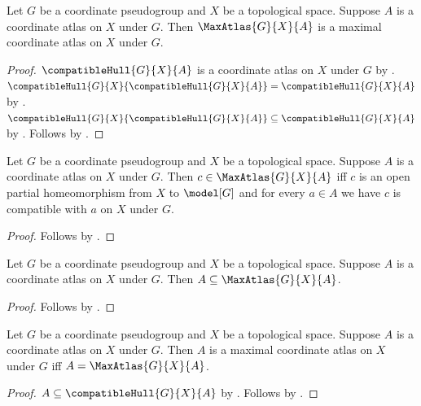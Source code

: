 \begin{classification}\label{max_atlas_is_maximal}
    Let $G$ be a coordinate pseudogroup and $X$ be a topological space.
    Suppose $A$ is a coordinate atlas on $X$ under $G$.
    Then $\MaxAtlas{G}{X}{A}$ is a maximal coordinate atlas on $X$ under $G$.
\end{classification}
\begin{proof}
    $\compatibleHull{G}{X}{A}$ is a coordinate atlas on $X$ under $G$ by
        .
    $\compatibleHull{G}{X}{\compatibleHull{G}{X}{A}}=\compatibleHull{G}{X}{A}$ by
        .
    $\compatibleHull{G}{X}{\compatibleHull{G}{X}{A}}\subseteq\compatibleHull{G}{X}{A}$
        by .
    Follows by .
\end{proof}

\begin{theorem}\label{max_atlas_member_iff}
    Let $G$ be a coordinate pseudogroup and $X$ be a topological space.
    Suppose $A$ is a coordinate atlas on $X$ under $G$.
    Then $c\in\MaxAtlas{G}{X}{A}$ iff
        $c$ is an open partial homeomorphism from $X$ to $\model[G]$ and
        for every $a\in A$ we have $c$ is compatible with $a$ on $X$ under $G$.
\end{theorem}
\begin{proof}
    Follows by .
\end{proof}

\begin{theorem}\label{atlas_subset_max_atlas}
    Let $G$ be a coordinate pseudogroup and $X$ be a topological space.
    Suppose $A$ is a coordinate atlas on $X$ under $G$.
    Then $A\subseteq\MaxAtlas{G}{X}{A}$.
\end{theorem}
\begin{proof}
    Follows by .
\end{proof}

\begin{theorem}\label{maximal_coordinate_atlas_fixed_point}
    Let $G$ be a coordinate pseudogroup and $X$ be a topological space.
    Suppose $A$ is a coordinate atlas on $X$ under $G$.
    Then $A$ is a maximal coordinate atlas on $X$ under $G$ iff
        $A=\MaxAtlas{G}{X}{A}$.
\end{theorem}
\begin{proof}
    $A\subseteq\compatibleHull{G}{X}{A}$ by .
    Follows by .
\end{proof}

